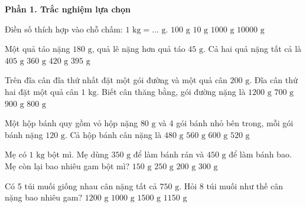 \textbf{Phần 1. Trắc nghiệm lựa chọn}

\begin{ex} %
Điền số thích hợp vào chỗ chấm: $1\text{ kg} = \dots\text{ g}$.
\choice
{$100\text{ g}$}
{$10\text{ g}$}
{\True $1000\text{ g}$}
{$10000\text{ g}$}
\end{ex}

\begin{ex} %
Một quả táo nặng $180\text{ g}$, quả lê nặng hơn quả táo $45\text{ g}$. Cả hai quả nặng tất cả là
\choice
{\True $405\text{ g}$}
{$360\text{ g}$}
{$420\text{ g}$}
{$395\text{ g}$}
\end{ex}

\begin{ex} %
Trên đĩa cân đĩa thứ nhất đặt một gói đường và một quả cân $200\text{ g}$. Đĩa cân thứ hai đặt một quả cân $1\text{ kg}$. Biết cân thăng bằng, gói đường nặng là
\choice
{$1200\text{ g}$}
{$700\text{ g}$}
{$900\text{ g}$}
{\True $800\text{ g}$}
\end{ex}

\begin{ex} %
Một hộp bánh quy gồm vỏ hộp nặng $80\text{ g}$ và 4 gói bánh nhỏ bên trong, mỗi gói bánh nặng $120\text{ g}$. Cả hộp bánh cân nặng là
\choice
{$480\text{ g}$}
{\True $560\text{ g}$}
{$600\text{ g}$}
{$520\text{ g}$}
\end{ex}

\begin{ex} %
Mẹ có $1\text{ kg}$ bột mì. Mẹ dùng $350\text{ g}$ để làm bánh rán và $450\text{ g}$ để làm bánh bao. Mẹ còn lại bao nhiêu gam bột mì?
\choice
{$150\text{ g}$}
{$250\text{ g}$}
{\True $200\text{ g}$}
{$300\text{ g}$}
\end{ex}

\begin{ex} %
Có 5 túi muối giống nhau cân nặng tất cả $750\text{ g}$. Hỏi 8 túi muối như thế cân nặng bao nhiêu gam?
\choice
{\True $1200\text{ g}$}
{$1000\text{ g}$}
{$1500\text{ g}$}
{$1150\text{ g}$}
\end{ex}

